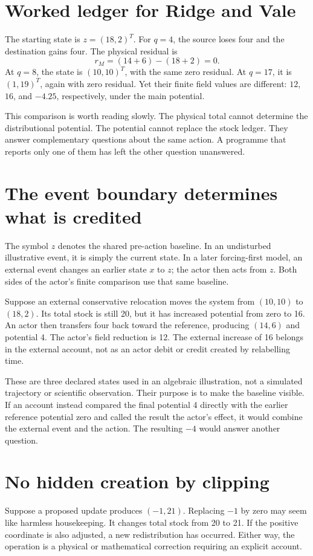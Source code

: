 \section{Worked ledger for Ridge and Vale}
The starting state is \(z=(18,2)^T\). For \(q=4\), the source loses four and the destination gains four. The physical residual is
\begin{equation}
 r_M=(14+6)-(18+2)=0.
\end{equation}
At \(q=8\), the state is \((10,10)^T\), with the same zero residual. At \(q=17\), it is \((1,19)^T\), again with zero residual. Yet their finite field values are different: \(12\), \(16\), and \(-4.25\), respectively, under the main potential.

This comparison is worth reading slowly. The physical total cannot determine the distributional potential. The potential cannot replace the stock ledger. They answer complementary questions about the same action. A programme that reports only one of them has left the other question unanswered.

\section{The event boundary determines what is credited}
The symbol \(z\) denotes the shared pre-action baseline. In an undisturbed illustrative event, it is simply the current state. In a later forcing-first model, an external event changes an earlier state \(x\) to \(z\); the actor then acts from \(z\). Both sides of the actor's finite comparison use that same baseline.

Suppose an external conservative relocation moves the system from \((10,10)\) to \((18,2)\). Its total stock is still 20, but it has increased potential from zero to 16. An actor then transfers four back toward the reference, producing \((14,6)\) and potential 4. The actor's field reduction is 12. The external increase of 16 belongs in the external account, not as an actor debit or credit created by relabelling time.

These are three declared states used in an algebraic illustration, not a simulated trajectory or scientific observation. Their purpose is to make the baseline visible. If an account instead compared the final potential 4 directly with the earlier reference potential zero and called the result the actor's effect, it would combine the external event and the action. The resulting \(-4\) would answer another question.

\section{No hidden creation by clipping}
Suppose a proposed update produces \((-1,21)\). Replacing \(-1\) by zero may seem like harmless housekeeping. It changes total stock from 20 to 21. If the positive coordinate is also adjusted, a new redistribution has occurred. Either way, the operation is a physical or mathematical correction requiring an explicit account.

